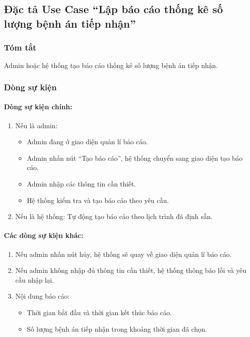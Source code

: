 \subsection{Đặc tả Use Case ``Lập báo cáo thống kê số lượng bệnh án tiếp nhận''}

\subsubsection{Tóm tắt}
Admin hoặc hệ thống tạo báo cáo thống kê số lượng bệnh án tiếp nhận.

\subsubsection{Dòng sự kiện}
\paragraph{\textbf{Dòng sự kiện chính:}}
\begin{enumerate}
  \item Nếu là admin:
    \begin{itemize}
      \item Admin đang ở giao diện quản lí báo cáo.
      \item Admin nhấn nút ``Tạo báo cáo'', hệ thống chuyển sang giao diện tạo báo cáo.
      \item Admin nhập các thông tin cần thiết.
      \item Hệ thống kiểm tra và tạo báo cáo theo yêu cầu.
    \end{itemize}
  \item Nếu là hệ thống: Tự động tạo báo cáo theo lịch trình đã định sẵn.
\end{enumerate}

\paragraph{\textbf{Các dòng sự kiện khác:}}
\begin{enumerate}
  \item Nếu admin nhấn nút hủy, hệ thống sẽ quay về giao diện quản lí báo cáo.
  \item Nếu admin không nhập đủ thông tin cần thiết, hệ thống thông báo lỗi và yêu cầu nhập lại.
  \item Nội dung báo cáo:
    \begin{itemize}
      \item Thời gian bắt đầu và thời gian kết thúc báo cáo.
      \item Số lượng bệnh án tiếp nhận trong khoảng thời gian đã chọn.
    \end{itemize}
\end{enumerate}


